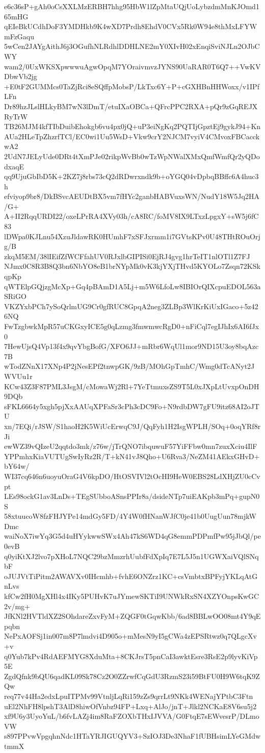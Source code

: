 e6c36sP+gAh0oCsXXLMzERBH7hhg95HbW1lZpMtaUQjUoLybzdmMnKJOmd165mHG
qEIeBkUCdhDoF3YMDHkb9K4wXD7Prdh8EhdV0CVx5Rk0W94e8thMxLFYWmFzGaqu
5wCen2JAYgAithJ6j3OGufhNLRdhlDDHLNE2mY0XIvH02xEnqiSviNJLn2OJbCWY
wam2/0UxWKSXpwwwuAgwOpqM7YOraivmvzJYNS90UaRAR0T6Q7++VwKVDbwVb2jg
+E0tF2GUMMcs0TaZjRci8eSQffpMobsP/LkTxc6Y+P+cGXHBnHHWoxx/v1IPfLFn
Dr89hzJLslHLkyBM7wN3lDmT/etuIXaOBCa+QFrcPPC2RXA+pQr9zGqREJXRyTrW
TB26MJM4kfTIbDuibEhokgb6vu4px0jQ+uP3eiNgKq2PQTIjGpztEj9gykJ94+Kn
AUa2HLeTpZhzrfTCl/EC0wi1Uu5WsD+Vkw9crY2NJCM7vyiV4CMvoxFBCacckwA2
2UdN7JELyUde0DRt4tXmPJe02rikpWvBb0wTzWpNWalXMxQmfWmfQr2yQDodxaqE
qq9UjuGbIbD5K+2KZ7j8rbs73cQ2dRDwrxndk9b+oYGQ04vDpbqBBffc6A4huc3h
efviyop9br8/DkBSvcAEUDtBX5vm7fHYc2ganbHABVuxsWN/NudY18W5Jq2HA/G+
A+II2RqqURDI22/oxeLPrRA4XVy03h/cA8RC/foMV8IX9LTxzLpgxY+sW5j6fC83
lDWpa0KJLnu54XzuJldawRK0HUmhF7xSFJxrmm1i7GVtsKPv0U48THtROuOrjg/B
zkqM5EM/38lIEifZfWCFfahUV0RJxlbGIPISi0EjRJ4gvg1hrTeIT1nlOTl1Z7FJ
NJmx0C8R3B8Q3bn6NbYO8eB1brNYpMk0vK3kjYXjTHvd5KYOLo7Zsqn72KSkqpKp
qWTElpGQjzgMcXp+Gq4pBAmD1A5Lj+m5W6LfoLw8IBIOrQIXcpuEDOL563aSRiGO
VKZYxbPCh7ySoQrlmUG9Cr0gfRUC8GpqA2neg3ZLBp3WlKrKiUxIGaco+5z426NQ
FwTzgbwkMpR57uCKGxyICE5g0qLzmg3fmwmwcRgD0+nFiCql7egIJhIx6AI6fJx0
7HewUjsQ4Vp13f4x9qvYbgBofG/XFO6JJ+mRbr6WqUl1mor9ND15U3oy8bqAzc7B
wTodZNnX17XNp4P2jNesEPf2tnwpGK/9zB/MOhGpTmhC/Wmg0dTcANyt2JWVUu1r
KCw43Z3F87PML3JsgM/cMowaWj2Rl+7YeTtmuxsZS9T5L0xJXpLtUvxpOnDH9DQb
sFKL6664y5xgh5pjXxAAUqXPFaSr3cPh3cDC9Fo+N9rdbDW7gFU9itz68AI2oJTU
xn/7EQi/rJSW/S1haoH2K5WiUcErwqC9J/QqFyh1H2IsgWPLH/SOq+0oqYRf8rJi
ewWZ39vQIzeU2qqtdo3mk/z76w/jTrQNO7ibquwuF57YiFFbw0mn7zuxXciu4IlF
YPPmhxKiaVUTUgSwIyRz2R/T+kN41vJ8Qho+U6Rva3/NeZM41AEkxGHvD+bY64w/
WI37cq646n6uoyuOraG4V6kpDO/HtOSVIVl2tOcHI9HeW0EBS28LdXHjZU0cCvpt
LEs98ockG1av3LnDs+TEgSUbboASnsPPIr8a/dsideNTp7uiEAKpb3mPq+gupN0S
58xtuucoW8fzFHJYPe14mdGy5FD/4Y4W0fHNanWJfC0je41b0UugUun78mjkWDmc
waiNoX7iwYq3G5d4uHYykwwSWx4Ah47kS6WD4qG8emmPDPmfPw95jJbQl/pe0evB
q0yiKtXJ2lvo7pXHoL7NQC29bzMmzrhUubfFdXpIq7E7L5J5n1UGWXaiVQlSNqbF
oJUJVtTiPitm2AWAVXv0IHcmhb+fvhE6ONZrz1KC+csVmbtxBPFyjYKLqAtGnLvs
kfCw2fH0MgXHl4x4IKy5PUHvK7uJYmewSKTiI9UNWkRxSN4XZYOnpsKwGC2v/mg+
JfKNl2HVTldXZ2SOhdareZxvFyM+ZQGF0tGqwKbb/6ad8BBLwOO08mt4Y9qEpqbn
NePxAOFSj1in007m8P7lmdvi4D905o+mMesN9yI5gCWa4zEPSRtwz0q7QLgcXv+v
q0Yub7kPv4RdAEFMYG8XduMta+8CKJrsT5pnCaI3awktEsre3RsE2p9lyvKiVp5E
ZgdQfnk9bQU6qadKL09Sk78Cz2O0ZZrwfCqGdU3RzmS23i59BtFU0H9W6tqK9ZQw
req77v44Ha2edxLpuITPMv99VtnljLqRi159zZs9qrrLt9NKk4WENajYPtbC3Ftn
uEl2NhFH8lpshT3AlD8hiwOfVnbz94FP+Lxq+AlJo/jnT+Jlkl2NCKaE8V6su5j2
xf9U6y3UyoYuL/b6fvLAZj4im8RaFZOXbTHxIJVVA/G0FtqE7sEWvesrP/DLmoVW
s897PPvwVpgqhnNdc1HTaYRJIGUQYV3+SzIOJ3De3NhaF1fUBHsimLYeGMdwtmmX
